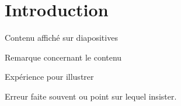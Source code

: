 


\biblio{}

\section*{Introduction}

\begin{ecran}
	Contenu affiché sur diapositives
\end{ecran}

\begin{remarques}
	Remarque concernant le contenu
\end{remarques}




\begin{experience}
	Expérience pour illustrer
\end{experience}

\begin{attention}
	Erreur faite souvent ou point sur lequel insister.
\end{attention}